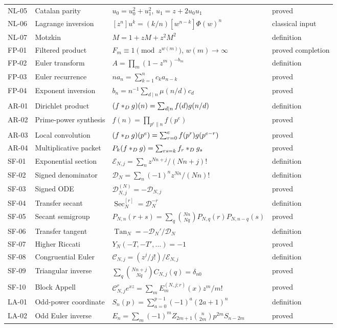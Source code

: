 \documentclass[11pt]{article}
\theoremstyle{definition}\newtheorem{definition}[theorem]{Definition}\newtheorem{example}[theorem]{Example}\newtheorem{construction}[theorem]{Construction}\newtheorem{algorithm}[theorem]{Algorithm}\newtheorem{conjecture}[theorem]{Conjecture}\newtheorem{problem}[theorem]{Problem}
\theoremstyle{remark}\newtheorem{remark}[theorem]{Remark}\newtheorem{boundary}[theorem]{Boundary}\newtheorem{certificate}[theorem]{Computational Certificate}\newtheorem{classical}[theorem]{Classical Input}\newtheorem{principle}[theorem]{Structural Principle}
\begin{document}
\begin{longtable}{L{.08\textwidth}L{.22\textwidth}L{.36\textwidth}L{.12\textwidth}}
NL-05&Catalan parity&$u_0=u_0^2+u_1^2$, $u_1=z+2u_0u_1$&proved\\
NL-06&Lagrange inversion&$[z^n]u^k=(k/n)[w^{n-k}]\Phi(w)^n$&classical input\\
NL-07&Motzkin&$M=1+zM+z^2M^2$&definition\\
FP-01&Filtered product&$F_m\equiv1\pmod{z^{w(m)}}$, $w(m)\to\infty$&proved completion\\
FP-02&Euler transform&$A=\prod_m(1-z^m)^{-b_m}$&definition\\
FP-03&Euler recurrence&$na_n=\sum_{k=1}^nc_ka_{n-k}$&proved\\
FP-04&Exponent inversion&$b_n=n^{-1}\sum_{d\mid n}\mu(n/d)c_d$&proved\\
AR-01&Dirichlet product&$(f\mathbin{\ast_D} g)(n)=\sum_{d\mid n}f(d)g(n/d)$&definition\\
AR-02&Prime-power synthesis&$f(n)=\prod_{p^e\parallel n}f(p^e)$&proved\\
AR-03&Local convolution&$(f\mathbin{\ast_D} g)(p^e)=\sum_{r=0}^ef(p^r)g(p^{e-r})$&proved\\
AR-04&Multiplicative packet&$P_k(f\mathbin{\ast_D} g)=\sum_{rs=k}f_r\mathbin{\ast_D} g_s$&proved\\
SF-01&Exponential section&$\mathcal E_{N,j}=\sum_nz^{Nn+j}/(Nn+j)!$&definition\\
SF-02&Signed denominator&$\mathcal D_N=\sum_n(-1)^nz^{Nn}/(Nn)!$&definition\\
SF-03&Signed ODE&$\mathcal D_{N,j}^{(N)}=-\mathcal D_{N,j}$&proved\\
SF-04&Transfer secant&$\operatorname{Sec}_N^{[r]}=\mathcal D_N^{-r}$&definition\\
SF-05&Secant semigroup&$P_{N,n}(r+s)=\sum_q\binom{Nn}{Nq}P_{N,q}(r)P_{N,n-q}(s)$&proved\\
SF-06&Transfer tangent&$\operatorname{Tan}_N=-\mathcal D_N'/\mathcal D_N$&definition\\
SF-07&Higher Riccati&$Y_N(-T,-T',\ldots)=-1$&proved\\
SF-08&Congruential Euler&$\mathcal C_{N,j}=(z^j/j!)/\mathcal E_{N,j}$&definition\\
SF-09&Triangular inverse&$\sum_q\binom{Nn+j}{Nq}C_{N,j}(q)=\delta_{n0}$&proved\\
SF-10&Block Appell&$\mathcal C_{N,j}^re^{xz}=\sum_mE_m^{(N,j;r)}(x)z^m/m!$&proved\\
LA-01&Odd-power coordinate&$S_n(p)=\sum_{a=0}^{p-1}(-1)^a(2a+1)^n$&definition\\
LA-02&Odd Euler inverse&$E_n=\sum_m(-1)^mZ_{2m+1}\binom n{2m}p^{2m}S_{n-2m}$&proved\\

\end{longtable}
\end{document}
